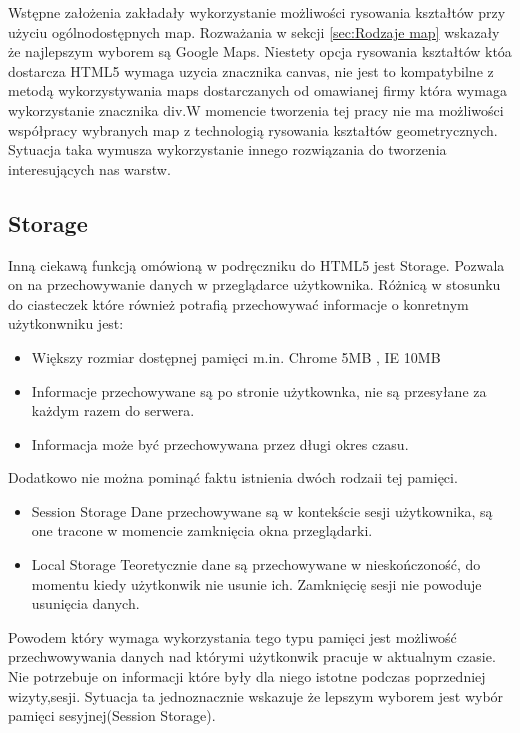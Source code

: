 Wstępne założenia zakładały wykorzystanie możliwości rysowania kształtów przy użyciu ogólnodostępnych map. Rozważania w sekcji \ref{sec:Rodzaje map} wskazały że najlepszym wyborem są Google Maps. Niestety opcja rysowania kształtów któa dostarcza HTML5 wymaga uzycia znacznika canvas, nie jest to kompatybilne z metodą wykorzystywania maps dostarczanych od omawianej firmy która wymaga wykorzystanie znacznika div.W momencie tworzenia tej pracy nie ma możliwości współpracy wybranych map z technologią rysowania kształtów geometrycznych. Sytuacja taka wymusza wykorzystanie innego rozwiązania do tworzenia interesujących nas warstw.

\subsection{Storage}
\label{subsec:storage5}
Inną ciekawą funkcją omówioną w podręczniku do HTML5  \cite{html5dive} jest Storage. Pozwala on na przechowywanie danych w przeglądarce użytkownika. Różnicą w stosunku do ciasteczek które również potrafią przechowywać informacje o konretnym użytkonwniku jest:
\begin{itemize}
\item
Większy rozmiar dostępnej pamięci m.in. Chrome 5MB \nocite{chrome5mb}, IE 10MB
\item
Informacje przechowywane są po stronie użytkownka, nie są przesyłane za każdym razem do serwera.
\item
Informacja może być przechowywana przez długi okres czasu.
\end{itemize}



Dodatkowo nie można pominąć faktu istnienia dwóch rodzaii tej pamięci.
\begin{itemize}

\item
Session Storage
Dane przechowywane są w kontekście sesji użytkownika, są one tracone w momencie zamknięcia okna przeglądarki.

\item
Local Storage
Teoretycznie dane są przechowywane w nieskończoność, do momentu kiedy użytkonwik nie usunie ich. Zamknięcię sesji nie powoduje usunięcia danych.

\end{itemize}

Powodem który wymaga wykorzystania tego typu pamięci jest możliwość przechwowywania danych nad którymi użytkonwik pracuje w aktualnym czasie. Nie potrzebuje on informacji które były dla niego istotne podczas poprzedniej wizyty,sesji. Sytuacja ta jednoznacznie wskazuje że lepszym wyborem jest wybór pamięci sesyjnej(Session Storage).


